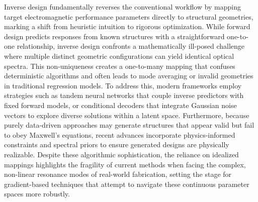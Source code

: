 \documentclass[11pt]{article}
\begin{document}
Inverse design fundamentally reverses the conventional workflow by mapping target electromagnetic performance parameters directly to structural geometries, marking a shift from heuristic intuition to rigorous optimization. While forward design predicts responses from known structures with a straightforward one-to-one relationship, inverse design confronts a mathematically ill-posed challenge where multiple distinct geometric configurations can yield identical optical spectra. This non-uniqueness creates a one-to-many mapping that confuses deterministic algorithms and often leads to mode averaging or invalid geometries in traditional regression models. To address this, modern frameworks employ strategies such as tandem neural networks that couple inverse predictors with fixed forward models, or conditional decoders that integrate Gaussian noise vectors to explore diverse solutions within a latent space. \citep{doi_10_1364_josab_497661_d333080a} \citep{doi_10_1038_s41467_025_57516_z_7c69e056} Furthermore, because purely data-driven approaches may generate structures that appear valid but fail to obey Maxwell's equations, recent advances incorporate physics-informed constraints and spectral priors to ensure generated designs are physically realizable. Despite these algorithmic sophistication, the reliance on idealized mappings highlights the fragility of current methods when facing the complex, non-linear resonance modes of real-world fabrication, setting the stage for gradient-based techniques that attempt to navigate these continuous parameter spaces more robustly. \citep{doi_10_1088_1361_6463_ad3e05_d24e0a0a} \citep{doi_10_23919_piers_fall62445_2025_11394631_4fdb8517} \citep{doi_10_71465_fapm546_bda368a5}
\end{document}
